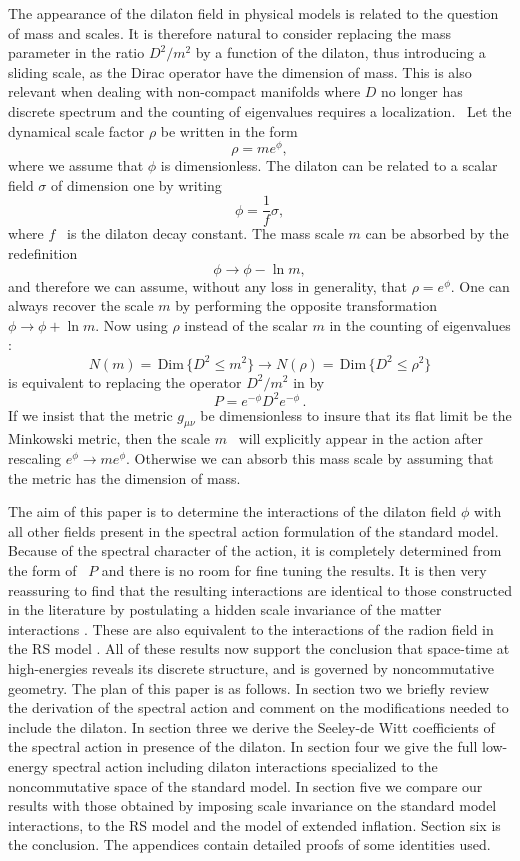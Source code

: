 \documentclass[12pt]{article}%
\begin{document}
The appearance of the dilaton field in physical models is related to the
question of mass and scales. It is therefore natural to consider replacing the
mass parameter in the ratio $D^{2}/m^{2}$ by a function of the dilaton, thus
introducing a sliding scale, as the Dirac operator have the dimension of mass.
This is also relevant when dealing with non-compact manifolds where $D$ no
longer has discrete spectrum and the counting of eigenvalues requires a
localization. \ Let the dynamical scale factor $\rho$ be written in the form
\[
\rho=me^{\phi},
\]
where we assume that $\phi$ is dimensionless. The dilaton can be related to a
scalar field $\sigma$ of dimension one by writing
\[
\phi=\frac{1}{f}\sigma,
\]
where $f$ \ is the dilaton decay constant. The mass scale $m$ can be absorbed
by the redefinition%
\[
\phi\rightarrow\phi-\ln m,
\]
and therefore we can assume, without any loss in generality, that
$\rho=e^{\phi}.$ One can always recover the scale $m$ by performing the
opposite transformation $\phi\rightarrow\phi+\ln m$. Now using $\rho$ instead
of the scalar $m$ in the counting of eigenvalues :
\[
N(m)=\,\mathrm{Dim}\,\{ D^{2} \leq m^{2}\} \to N(\rho)=\,\mathrm{Dim}\,\{
D^{2} \leq\rho^{2}\}
\]
is equivalent to replacing the operator $D^{2}/m^{2}$ in \cite{ACAC} by
\[
P=e^{-\phi}D^{2}e^{-\phi}\,.
\]
If we insist that the metric $g_{\mu\nu}$ be dimensionless to insure that its
flat limit be the Minkowski metric, then the scale $m$ \ will explicitly
appear in the action after rescaling $e^{\phi}\rightarrow me^{\phi}$.
Otherwise we can absorb this mass scale by assuming that the metric has the
dimension of mass.

The aim of this paper is to determine the interactions of the dilaton field
$\phi$ with all other fields present in the spectral action formulation of the
standard model. Because of the spectral character of the action, it is
completely determined from the form of \ $P$ and there is no room for fine
tuning the results. It is then very reassuring to find that the resulting
interactions are identical to those constructed in the literature by
postulating a hidden scale invariance of the matter interactions \cite{Bubu}.
These are also equivalent to the interactions of the radion field in the RS
model \cite{RS}. All of these results now support the conclusion that
space-time at high-energies reveals its discrete structure, and is governed by
noncommutative geometry. The plan of this paper is as follows. In section two
we briefly review the derivation of the spectral action and comment on the
modifications needed to include the dilaton. In section three we derive the
Seeley-de Witt coefficients of the spectral action in presence of the dilaton.
In section four we give the full low-energy spectral action including dilaton
interactions specialized to the noncommutative space of the standard model. In
section five we compare our results with those obtained by imposing scale
invariance on the standard model interactions, to the RS model and the model
of extended inflation. Section six is the conclusion. The appendices contain
detailed proofs of some identities used.
\end{document}
